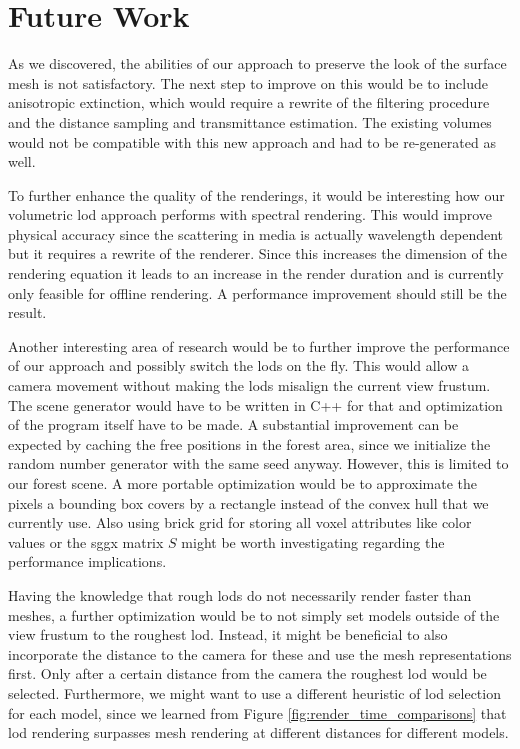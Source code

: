 \chapter{Future Work}
\label{chap:future_work}
As we discovered, the abilities of our approach to preserve the look of the surface mesh is not satisfactory.
The next step to improve on this would be to include anisotropic extinction, which would require a rewrite of the filtering procedure and the distance sampling and transmittance estimation.
The existing volumes would not be compatible with this new approach and had to be re-generated as well.

To further enhance the quality of the renderings, it would be interesting how our volumetric \ac{lod} approach performs with spectral rendering.
This would improve physical accuracy since the scattering in media is actually wavelength dependent \cite{novak_overview} but it requires a rewrite of the renderer.
Since this increases the dimension of the rendering equation it leads to an increase in the render duration and is currently only feasible for offline rendering.
A performance improvement should still be the result.

Another interesting area of research would be to further improve the performance of our approach and possibly switch the \acsp{lod} on the fly.
This would allow a camera movement without making the \acsp{lod} misalign the current view frustum.
The scene generator would have to be written in C++ for that and optimization of the program itself have to be made.
A substantial improvement can be expected by caching the free positions in the forest area, since we initialize the random number generator with the same seed anyway.
However, this is limited to our forest scene.
A more portable optimization would be to approximate the pixels a bounding box covers by a rectangle instead of the convex hull that we currently use.
Also using brick grid for storing all voxel attributes like color values or the \ac{sggx} matrix $S$ might be worth investigating regarding the performance implications.

Having the knowledge that rough \acsp{lod} do not necessarily render faster than meshes, a further optimization would be to not simply set models outside of the view frustum to the roughest \ac{lod}.
Instead, it might be beneficial to also incorporate the distance to the camera for these and use the mesh representations first.
Only after a certain distance from the camera the roughest \ac{lod} would be selected.
Furthermore, we might want to use a different heuristic of \ac{lod} selection for each model, since we learned from Figure \ref{fig:render_time_comparisons} that \ac{lod} rendering surpasses mesh rendering at different distances for different models.
